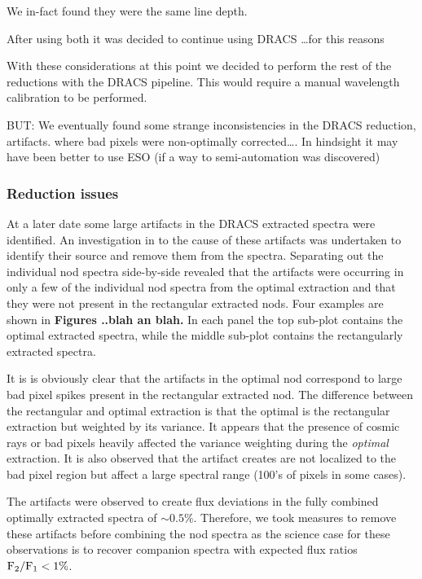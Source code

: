 We in-fact found they were the same line depth.


After using both it was decided to continue using DRACS \ldots for this reasons

With these considerations at this point we decided to perform the rest of the reductions with the DRACS pipeline. This would require a manual wavelength calibration to be performed. 


BUT: We eventually found some strange inconsistencies in the DRACS reduction, artifacts. where bad pixels were non-optimally corrected\ldots.
In hindsight it may have been better to use ESO (if a way to semi-automation was discovered)

\subsubsection{Reduction issues}
\label{subsubsec:reductionartifacts}
At a later date some large artifacts in the DRACS extracted spectra were identified. An investigation in to the cause of these artifacts was undertaken to identify their source and remove them from the spectra. Separating out the individual nod spectra side-by-side revealed that the artifacts were occurring in only a few of the individual nod spectra from the optimal extraction and that they were not present in the rectangular extracted nods. Four examples are shown in \textbf{Figures ..blah an blah.} In each panel the top sub-plot contains the optimal extracted spectra, while the middle sub-plot contains the rectangularly extracted spectra.

It is is obviously clear that the artifacts in the optimal nod correspond to large bad pixel spikes present in the rectangular extracted nod. The difference between the rectangular and optimal extraction is that the optimal is the rectangular extraction but weighted by its variance. It appears that the presence of cosmic rays or bad pixels heavily affected the variance weighting during the \emph{optimal} extraction. It is also observed that the artifact creates are not localized to the bad pixel region but affect a large spectral range (100's of pixels in some cases). 

The artifacts were observed to create flux deviations in the fully combined optimally extracted spectra of \(\sim 0.5\% \). Therefore, we took measures to remove these artifacts before combining the nod spectra as the science case for these observations is to recover companion spectra with expected flux ratios \(\rm {F_2}/{F_1} < 1\% \). 

